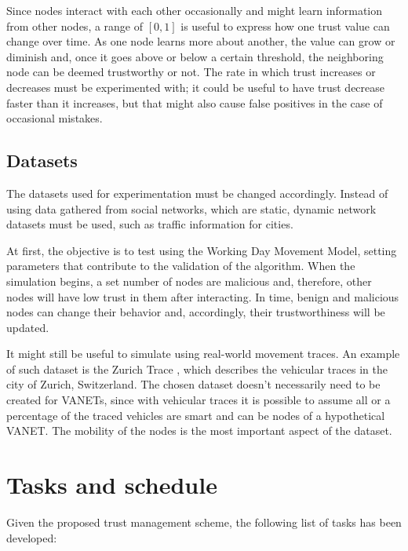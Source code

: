Since nodes interact with each other occasionally and might learn information from other nodes, a range of $[0,1]$ is useful to express how one trust value can change over time.
As one node learns more about another, the value can grow or diminish and, once it goes above or below a certain threshold, the neighboring node can be deemed trustworthy or not.
The rate in which trust increases or decreases must be experimented with; it could be useful to have trust decrease faster than it increases, but that might also cause false positives in the case of occasional mistakes.

\subsection{Datasets}
The datasets used for experimentation must be changed accordingly.
Instead of using data gathered from social networks, which are static, dynamic network datasets must be used, such as traffic information for cities.

At first, the objective is to test using the Working Day Movement Model, setting parameters that contribute to the validation of the algorithm.
When the simulation begins, a set number of nodes are malicious and, therefore, other nodes will have low trust in them after interacting.
In time, benign and malicious nodes can change their behavior and, accordingly, their trustworthiness will be updated.

It might still be useful to simulate using real-world movement traces.
An example of such dataset is the Zurich Trace \cite{zurichtrace}, which describes the vehicular traces in the city of Zurich, Switzerland.
The chosen dataset doesn't necessarily need to be created for VANETs, since with vehicular traces it is possible to assume all or a percentage of the traced vehicles are smart and can be nodes of a hypothetical VANET.
The mobility of the nodes is the most important aspect of the dataset.

\section{Tasks and schedule}

Given the proposed trust management scheme, the following list of tasks has been developed:

